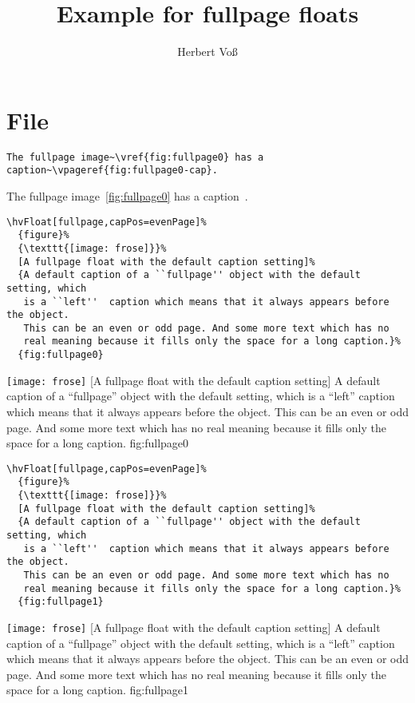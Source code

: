 \documentclass[twocolumn]{scrartcl}
\begin{document}
\title{Example for fullpage floats}
\author{Herbert Voß}
\maketitle

\tableofcontents

\blinddocument

\section{File \texttt{\jobname}}

\begin{lstlisting}
The fullpage image~\vref{fig:fullpage0} has a caption~\vpageref{fig:fullpage0-cap}.
\end{lstlisting}

The fullpage image~\vref{fig:fullpage0} has a caption~.

\begin{lstlisting}
\hvFloat[fullpage,capPos=evenPage]%
  {figure}%
  {\texttt{[image: frose]}}%
  [A fullpage float with the default caption setting]%
  {A default caption of a ``fullpage'' object with the default setting, which
   is a ``left''  caption which means that it always appears before the object.
   This can be an even or odd page. And some more text which has no
   real meaning because it fills only the space for a long caption.}%
  {fig:fullpage0}
\end{lstlisting}


\Float[capPos=evenPage]
%
  {\texttt{[image: frose]}}%
  [A fullpage float with the default caption setting]%
  {A default caption of a ``fullpage'' object with the default setting, which
   is a ``left''  caption which means that it always appears before the object.
   This can be an even or odd page. And some more text which has no
   real meaning because it fills only the space for a long caption.}%
  {fig:fullpage0}

\blinddocument

\begin{lstlisting}
\hvFloat[fullpage,capPos=evenPage]%
  {figure}%
  {\texttt{[image: frose]}}%
  [A fullpage float with the default caption setting]%
  {A default caption of a ``fullpage'' object with the default setting, which
   is a ``left''  caption which means that it always appears before the object.
   This can be an even or odd page. And some more text which has no
   real meaning because it fills only the space for a long caption.}%
  {fig:fullpage1}
\end{lstlisting}


\Float[capPos=evenPage]
%
  {\texttt{[image: frose]}}%
  [A fullpage float with the default caption setting]%
  {A default caption of a ``fullpage'' object with the default setting, which
   is a ``left''  caption which means that it always appears before the object.
   This can be an even or odd page. And some more text which has no
   real meaning because it fills only the space for a long caption.}%
  {fig:fullpage1}

\blinddocument


\Blindtext
\end{document}
